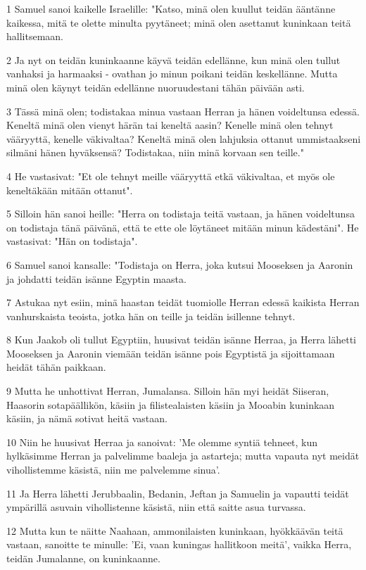 \par 1 Samuel sanoi kaikelle Israelille: "Katso, minä olen kuullut teidän ääntänne kaikessa, mitä te olette minulta pyytäneet; minä olen asettanut kuninkaan teitä hallitsemaan.
\par 2 Ja nyt on teidän kuninkaanne käyvä teidän edellänne, kun minä olen tullut vanhaksi ja harmaaksi - ovathan jo minun poikani teidän keskellänne. Mutta minä olen käynyt teidän edellänne nuoruudestani tähän päivään asti.
\par 3 Tässä minä olen; todistakaa minua vastaan Herran ja hänen voideltunsa edessä. Keneltä minä olen vienyt härän tai keneltä aasin? Kenelle minä olen tehnyt vääryyttä, kenelle väkivaltaa? Keneltä minä olen lahjuksia ottanut ummistaakseni silmäni hänen hyväksensä? Todistakaa, niin minä korvaan sen teille."
\par 4 He vastasivat: "Et ole tehnyt meille vääryyttä etkä väkivaltaa, et myös ole keneltäkään mitään ottanut".
\par 5 Silloin hän sanoi heille: "Herra on todistaja teitä vastaan, ja hänen voideltunsa on todistaja tänä päivänä, että te ette ole löytäneet mitään minun kädestäni". He vastasivat: "Hän on todistaja".
\par 6 Samuel sanoi kansalle: "Todistaja on Herra, joka kutsui Mooseksen ja Aaronin ja johdatti teidän isänne Egyptin maasta.
\par 7 Astukaa nyt esiin, minä haastan teidät tuomiolle Herran edessä kaikista Herran vanhurskaista teoista, jotka hän on teille ja teidän isillenne tehnyt.
\par 8 Kun Jaakob oli tullut Egyptiin, huusivat teidän isänne Herraa, ja Herra lähetti Mooseksen ja Aaronin viemään teidän isänne pois Egyptistä ja sijoittamaan heidät tähän paikkaan.
\par 9 Mutta he unhottivat Herran, Jumalansa. Silloin hän myi heidät Siiseran, Haasorin sotapäällikön, käsiin ja filistealaisten käsiin ja Mooabin kuninkaan käsiin, ja nämä sotivat heitä vastaan.
\par 10 Niin he huusivat Herraa ja sanoivat: 'Me olemme syntiä tehneet, kun hylkäsimme Herran ja palvelimme baaleja ja astarteja; mutta vapauta nyt meidät vihollistemme käsistä, niin me palvelemme sinua'.
\par 11 Ja Herra lähetti Jerubbaalin, Bedanin, Jeftan ja Samuelin ja vapautti teidät ympärillä asuvain vihollistenne käsistä, niin että saitte asua turvassa.
\par 12 Mutta kun te näitte Naahaan, ammonilaisten kuninkaan, hyökkäävän teitä vastaan, sanoitte te minulle: 'Ei, vaan kuningas hallitkoon meitä', vaikka Herra, teidän Jumalanne, on kuninkaanne.
